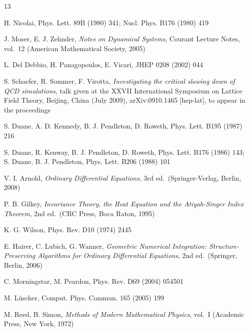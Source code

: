 \begin{thebibliography}{13}
\setlength{\itemsep}{0.2ex}

H. Nicolai,
Phys. Lett. 89B (1980) 341;
Nucl. Phys. B176 (1980) 419

J. Moser, E. J. Zehnder,
{\itshape Notes on Dynamical Systems},
Courant Lecture Notes, vol.~12 (American Mathematical Society, 2005)

L. Del Debbio, H. Panagopoulos, E. Vicari,
JHEP 0208 (2002) 044

S. Schaefer, R. Sommer, F. Virotta,
{\itshape Investigating the critical slowing down of QCD simulations},
talk given at the XXVII International Symposium on Lattice Field Theory,
Beijing, China (July 2009), arXiv:0910.1465 [hep-lat],
to appear in the proceedings

S. Duane, A. D. Kennedy, B. J. Pendleton, D. Roweth,
Phys. Lett. B195 (1987) 216

S. Duane, R. Kenway, B. J. Pendleton, D. Roweth,
Phys. Lett. B176 (1986) 143;
S. Duane, B. J. Pendleton,
Phys. Lett. B206 (1988) 101

V. I. Arnold,
{\itshape Ordinary Differential Equations}, 3rd ed.\ (Springer-Verlag, Berlin, 2008)

P. B. Gilkey,
{\itshape Invariance Theory, the Heat Equation and the Atiyah-Singer
Index Theorem}, 2nd ed.\ (CRC Press, Boca Raton, 1995)

K. G. Wilson,
Phys. Rev. D10 (1974) 2445

E. Hairer, C. Lubich, G. Wanner,
{\itshape Geometric Numerical Integration:
Structure-Preserving Algorithms for Ordinary Differential Equations},
2nd ed.\ (Springer, Berlin, 2006)

C. Morningstar, M. Peardon,
Phys. Rev. D69 (2004) 054501

M. L\"uscher,
Comput. Phys. Commun. 165 (2005) 199

M. Reed, B. Simon,
{\itshape Methods of Modern Mathematical Physics}, vol.~I
(Academic Press, New York, 1972)

\end{thebibliography}
